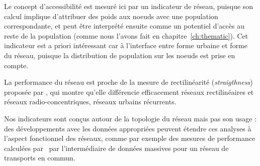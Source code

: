 Le concept d'accessibilité est mesuré ici par un indicateur de réseau, puisque son calcul implique d'attribuer des poids aux noeuds avec une population correspondante, et peut être interprété ensuite comme un potentiel d'accès au reste de la population (comme nous l'avons fait en chapitre~\ref{ch:thematic}). Cet indicateur est a priori intéressant car à l'interface entre forme urbaine et forme du réseau, puisque la distribution de population sur les noeuds est prise en compte.

La performance du réseau est proche de la mesure de rectilinéarité (\emph{straigthness}) proposée par \cite{josselin2016straightness}, qui montre qu'elle différencie efficacement réseaux rectilinéaires et réseaux radio-concentriques, réseaux urbains récurrents.

Nos indicateurs sont conçus autour de la topologie du réseau mais pas son usage : des développements avec les données appropriées peuvent étendre ces analyses à l'aspect fonctionnel des réseaux, comme par exemple des mesures de performance calculées par~\cite{trepanier2009calculation} par l'intermédiaire de données massives pour un réseau de transports en commun.








